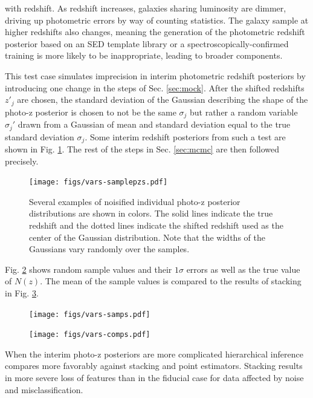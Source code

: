 \documentclass[preprint]{aastex}
\begin{document}
with redshift.  As redshift increases, galaxies sharing luminosity are dimmer, 
driving up photometric errors by way of counting statistics.  The galaxy sample 
at higher redshifts also changes, meaning the generation of the photometric 
redshift posterior based on an SED template library or a 
spectroscopically-confirmed training is more likely to be inappropriate, 
leading to broader components.

This test case simulates imprecision in interim photometric redshift posteriors 
by introducing one change in the steps of Sec. \ref{sec:mock}.  After the 
shifted redshifts $z'_{j}$ are chosen, the standard deviation of the Gaussian 
describing the shape of the photo-z posterior is chosen to not be the same 
$\sigma_{j}$ but rather a random variable $\sigma_{j}'$ drawn from a Gaussian 
of mean and standard deviation equal to the true standard deviation 
$\sigma_{j}$.  Some interim redshift posteriors from such a test are shown in 
Fig. \ref{fig:noisypzs}.  The rest of the steps in Sec. \ref{sec:mcmc} are then 
followed precisely.

\begin{figure}
\texttt{[image: figs/vars-samplepzs.pdf]}
\caption{Several examples of noisified individual photo-z posterior 
distributions are shown in colors.  The solid lines indicate the true redshift 
and the dotted lines indicate the shifted redshift used as the center of the 
Gaussian distribution.  Note that the widths of the Gaussians vary randomly 
over the samples.}
\label{fig:noisypzs}
\end{figure}

Fig. \ref{fig:noisy-samp} shows random sample values and their $1\sigma$ errors 
as well as the true value of $N(z)$.  The mean of the sample values is compared 
to the results of stacking in Fig. \ref{fig:noisy-comp}.

\begin{figure}
\texttt{[image: figs/vars-samps.pdf]}
\caption{}
\label{fig:noisy-samp}
\end{figure}

\begin{figure}
\texttt{[image: figs/vars-comps.pdf]}
\caption{}
\label{fig:noisy-comp}
\end{figure}

When the interim photo-z posteriors are more complicated hierarchical inference 
compares more favorably against stacking and point estimators.   Stacking 
results in more severe loss of features than in the fiducial case for data 
affected by noise and misclassification.  
\end{document}
